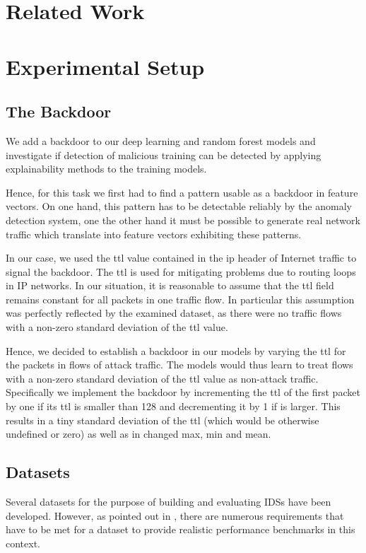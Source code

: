 \documentclass[10pt,sigconf,letterpaper,dvipsnames]{acmart}
\begin{document}
\section{Related Work}

\section{Experimental Setup} \label{sec:ml_approaches}
\subsection{The Backdoor}

We add a backdoor to our deep learning and random forest models and investigate if detection of malicious training can be detected by applying explainability methods to the training models.

Hence, for this task we first had to find a pattern usable as a backdoor in feature vectors. On one hand, this pattern has to be detectable reliably by the anomaly detection system, one the other hand it must be possible to generate real network traffic which translate into feature vectors exhibiting these patterns.

In our case, we used the \gls{ttl} value contained in the \gls{ip} header of Internet traffic to signal the backdoor. The \gls{ttl} is used for mitigating problems due to routing loops in IP networks. In our situation, it is reasonable to assume that the \gls{ttl} field remains constant for all packets in one traffic flow. In particular this assumption was perfectly reflected by the examined dataset, as there were no traffic flows with a non-zero standard deviation of the \gls{ttl} value.

Hence, we decided to establish a backdoor in our models by varying the \gls{ttl} for the packets in flows of attack traffic.  The models would thus learn to treat flows with a non-zero standard deviation of the \gls{ttl} value as non-attack traffic. Specifically we implement the backdoor by incrementing the \gls{ttl} of the first packet by one if its \gls{ttl} is smaller than 128 and decrementing it by 1 if is larger. This results in a tiny standard deviation of the \gls{ttl} (which would be otherwise undefined or zero) as well as in changed max, min and mean.
\subsection{Datasets}
Several datasets for the purpose of building and evaluating IDSs have been developed. However, as pointed out in \cite{gharib_evaluation_2016}, there are numerous requirements that have to be met for a dataset to provide realistic performance benchmarks in this context.
\end{document}
